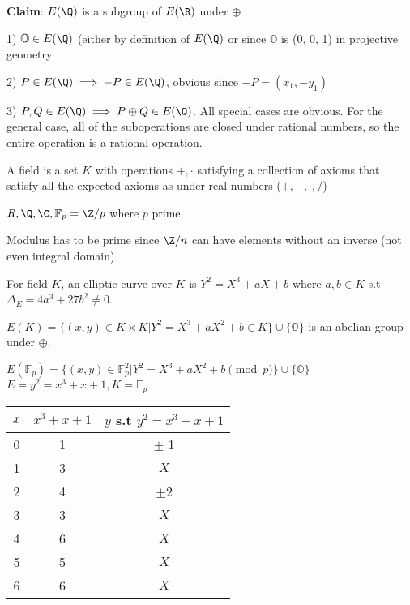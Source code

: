 \documentclass[twoside, 10pt]{article}
\newcommand{\F}{\mathbb{F}}
\renewcommand{\O}{\mathbb{O}}
\begin{document}
\textbf{Claim}: $E(\Q)$ is a subgroup of $E(\R)$ under $\oplus$

1) $\O \in E(\Q)$ (either by definition of $E(\Q)$ or since $\O$ is (0, 0, 1) in projective geometry

2) $P \in E(\Q) \implies -P \in E(\Q)$, obvious since $-P = (x_1, -y_1)$

3) $P, Q \in E(\Q) \implies P\oplus Q \in E(\Q)$. All special cases are obvious. For the general case, all of the suboperations are closed under rational numbers, so the entire operation is a rational operation.

\begin{rmk}
    A field is a set $K$ with operations $+, \cdot$ satisfying a collection of axioms that satisfy all the expected axioms as under real numbers ($+, -, \cdot, /$)
\end{rmk}

\begin{exm*}
    $R, \Q, \C, \F_p = \Z/p$ where $p$ prime.
\end{exm*}

\begin{rmk}
    Modulus has to be prime since $\Z/n$ can have elements without an inverse (not even integral domain)
\end{rmk}

\begin{defn}
    For field $K$, an elliptic curve over $K$ is $Y^2 = X^3 + aX + b$ where $a, b \in K$ s.t $\Delta_E = 4a^3 + 27b^2 \neq 0$.
\end{defn}

$E(K) = \{(x, y) \in K \times K | Y^2 = X^3 + aX^2 + b \in K\} \cup \{\O\}$ is an abelian group under $\oplus$. 

\begin{exm*}
    $E(\F_p) = \{(x, y) \in \F_p^2 | Y^2 = X^3 + aX^2 + b\pmod{p}\} \cup \{\O\}$\\
    $E = y^2 = x^3 + x + 1, K = \F_p$
\end{exm*}

\begin{tabular}{c|c|c}
    $x$ & $x^3 + x + 1$ & $y$ s.t $y^2 = x^3 + x + 1$\\
    \hline
    0 & 1 & $\pm$ 1\\
    1 & 3 & $X$\\
    2 & 4 & $\pm$2\\
    3 & 3 & $X$\\
    4 & 6 & $X$\\
    5 & 5 & $X$\\
    6 & 6 & $X$\\
\end{tabular}
\end{document}

